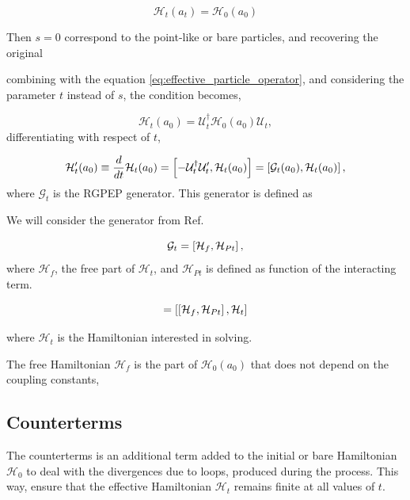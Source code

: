 \documentclass[11pt,a4paper,twoside,pdf]{article}
\numberwithin{equation}{section}
\begin{document}
\begin{equation}
    \mathcal{H}_t(a_t) = \mathcal{H}_0(a_0)
\end{equation}

Then $s=0$ correspond to the point-like or bare particles, and recovering the original

combining with the equation \eqref{eq:effective_particle_operator}, and considering 
the parameter $t$ instead of $s$, the condition becomes,

\begin{equation}
    \mathcal{H}_t(a_0) = \mathcal{U}_t^\dagger\mathcal{H}_0(a_0) \mathcal{U}_t,
\end{equation}
differentiating with respect of $t$, 

\begin{equation}
    \mathcal{H}_t^\prime (a_0) \equiv \frac{d}{dt}\mathcal{H}_t(a_0) = 
    \left[ -\mathcal{U}_t^\dagger \mathcal{U}_t^\prime, \mathcal{H}_t(a_0) \right] 
    = \left[ \mathcal{G}_t(a_0), \mathcal{H}_t(a_0) \right],
\end{equation}
where $\mathcal{G}_t$ is the RGPEP generator. This generator is defined as 

We will consider the generator from Ref. \cite{PEP}

\begin{equation}
    \mathcal{G}_t = \left[ \mathcal{H}_f, \mathcal{H}_{Pt} \right],
\end{equation}
where $\mathcal{H}_f$, the free part of $\mathcal{H}_t$, and $\mathcal{H}_{Pt}$ is 
defined as function of the interacting term.

\begin{equation}
    =  \left[ \left[ \mathcal{H}_f, \mathcal{H}_{Pt} \right], \mathcal{H}_t \right]
\end{equation}

where $\mathcal{H}_t$ is the Hamiltonian interested in solving.

The free Hamiltonian $\mathcal{H}_f$ is the part of $\mathcal{H}_0(a_0)$ that does 
not depend on the coupling constants, 


\subsection{Counterterms}

The counterterms is an additional term added to the initial or bare Hamiltonian 
$\mathcal{H}_0$ to deal with the divergences due to loops, produced during the 
process. This way, ensure that the effective Hamiltonian $\mathcal{H}_t$ remains 
finite at all values of $t$.
\end{document}
